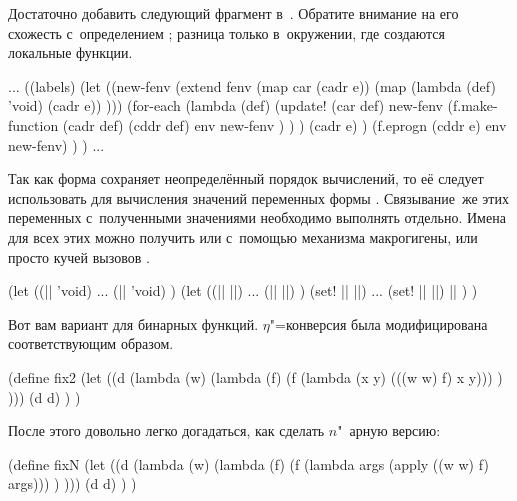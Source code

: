 
Достаточно добавить следующий фрагмент в~. Обратите внимание на
его схожесть с~определением ; разница только в~окружении, где создаются
локальные функции.

\begin{code:lisp}
...
((labels)
 (let ((new-fenv (extend fenv
                         (map car (cadr e))
                         (map (lambda (def) 'void) (cadr e)) )))
   (for-each (lambda (def)
               (update! (car def)
                        new-fenv
                        (f.make-function (cadr def) (cddr def)
                                         env new-fenv ) ) )
             (cadr e) )
   (f.eprogn (cddr e) env new-fenv) ) )
...
\end{code:lisp}



Так как форма  сохраняет неопределённый порядок вычислений, то её 
следует использовать для вычисления значений переменных формы .
Связывание~же этих переменных с~полученными значениями необходимо выполнять
отдельно. Имена для всех этих  можно получить или с~помощью
механизма макрогигены, или просто кучей вызовов .

\begin{code:lisp}
(let ((|| 'void)
      ...
      (|| 'void) )
  (let ((|| ||)
        ...
        (|| ||) )
    (set! || ||)
    ...
    (set! || ||)
    || ) )
\end{code:lisp}



Вот вам вариант для бинарных функций. $\eta$"=конверсия была модифицирована
соответствующим образом.

\begin{code:lisp}
(define fix2
  (let ((d (lambda (w)
             (lambda (f)
               (f (lambda (x y) (((w w) f) x y))) ) )))
    (d d) ) )
\end{code:lisp}

\noindent
После этого довольно легко догадаться, как сделать $n$"~арную версию:

\begin{code:lisp}
(define fixN
  (let ((d (lambda (w)
             (lambda (f)
               (f (lambda args (apply ((w w) f) args))) ) )))
    (d d) ) )
\end{code:lisp}


